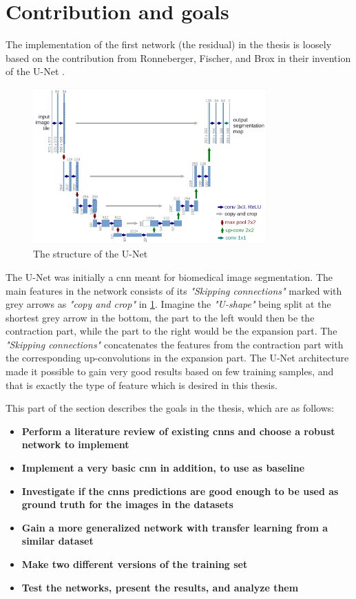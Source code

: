 \documentclass[USenglish]{ifimaster}  %
\begin{document}
\section{Contribution and goals}
The implementation of the first network (the residual) in the thesis is loosely based on the contribution from Ronneberger, Fischer, and Brox in their invention of the U-Net \cite{website:u_net_article}. 
\begin{figure}[ht]
    \centering
    \includegraphics[width=0.8\textwidth]{bilder/u_net.png}
    \caption{The structure of the U-Net \cite{website:u_net}}
    \label{fig:u_net}
\end{figure}
The U-Net was initially a \ac{cnn} meant for biomedical image segmentation. The main features in the network consists of its \textit{"Skipping connections"} marked with grey arrows as \textit{"copy and crop"} in \cref{fig:u_net}. Imagine the \textit{"U-shape"} being split at the shortest grey arrow in the bottom, the part to the left would then be the contraction part, while the part to the right would be the expansion part. The \textit{"Skipping connections"} concatenates the features from the contraction part with the corresponding up-convolutions in the expansion part. The U-Net architecture made it possible to gain very good results based on few training samples, and that is exactly the type of feature which is desired in this thesis.

This part of the section describes the goals in the thesis, which are as follows:
\begin{itemize}
    \item \textbf{Perform a literature review of existing \acp{cnn} and choose a robust network to implement}
    \item \textbf{Implement a very basic \ac{cnn} in addition, to use as baseline}
    \item \textbf{Investigate if the \acp{cnn} predictions are good enough to be used as ground truth for the images in the datasets}
    \item \textbf{Gain a more generalized network with transfer learning from a similar dataset}
    \item \textbf{Make two different versions of the training set}
    \item \textbf{Test the networks, present the results, and analyze them}
\end{itemize}
\end{document}
